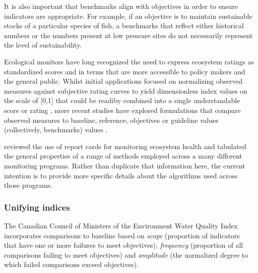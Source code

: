 It is also important that benchmarks align with objectives in order to ensure indicators are
appropriate.  For example, if an objective is to maintain sustainable stocks of a particular species
of fish, a benchmarks that reflect either historical numbers or the numbers present at low pressure
sites do not necessarily represent the level of sustainability.

Ecological monitors have long recognized the need to express ecosystem ratings as standardized
scores and in terms that are more accessible to policy makers and the general public.  Whilst
initial applications focused on normalizing observed measures against subjective rating curves to
yield dimensionless index values on the scale of [0,1] that could be readiby combined into a single
understandable score or rating \citep[e.g.][]{Miller-1986}, more recent studies have explored
formulations that compare observed measures to baseline, reference, objectives or guideline values
(collectively, benchmarks) values \citep[e.g.][]{CCME-2001, Hurley-2012-3544, Jones-2013}.

\citet{Connolly-2013} reviewed the use of report cards for monitoring ecosystem health and tabulated
the general properties of a range of methods employed across a many different monitoring programs.
Rather than duplicate that information here, the current intention is to provide more specific
details about the algorithms used across those programs.

\subsubsection{Unifying indices}\label{sec:unifyingIndices}

The Canadian Council of Ministers of the Environment Water Quality Index \citep[CCME
WQI;][]{CCME-2001} incorporates comparisons to baseline based on \textit{scope} (proportion of
indicators that have one or more failures to meet objectives), \textit{frequency} (proportion of all
comparisons failing to meet objectives) and \textit{amplitude} (the normalized degree to which
failed comparisons exceed objectives).

